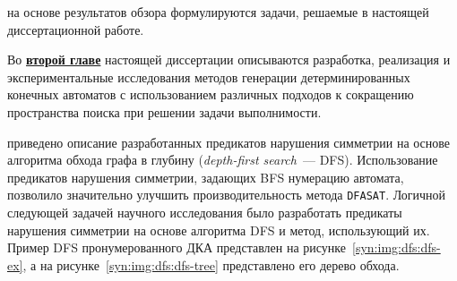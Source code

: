 \insection{\ref{sec:review:tasks}} на основе результатов обзора формулируются задачи, решаемые в настоящей диссертационной работе.


Во \textbf{\underline{второй главе}} настоящей диссертации описываются разработка, реализация и экспериментальные исследования методов генерации детерминированных конечных автоматов с использованием различных подходов к сокращению пространства поиска при решении задачи выполнимости.

\insection{\ref{sec:space:dfs}} приведено описание разработанных предикатов нарушения симметрии на основе алгоритма обхода графа в глубину (\emph{depth-first search}~--- DFS). 
Использование предикатов нарушения симметрии, задающих BFS нумерацию автомата, позволило значительно улучшить производительность метода \texttt{DFASAT}.
Логичной следующей задачей научного исследования было разработать предикаты нарушения симметрии на основе алгоритма DFS и метод, использующий их.
Пример DFS пронумерованного ДКА представлен на рисунке~\ref{syn:img:dfs:dfs-ex}, а на рисунке~\ref{syn:img:dfs:dfs-tree} представлено его дерево обхода.

